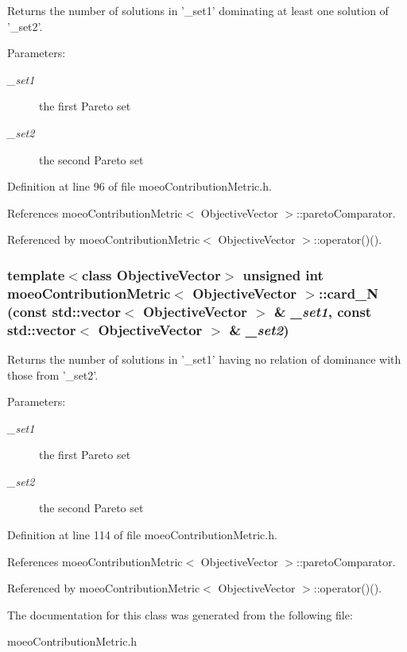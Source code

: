Returns the number of solutions in '\_\-set1' dominating at least one solution of '\_\-set2'. 

\begin{Desc}
\item[Parameters:]
\begin{description}
\item[{\em \_\-set1}]the first Pareto set \item[{\em \_\-set2}]the second Pareto set \end{description}
\end{Desc}


Definition at line 96 of file moeo\-Contribution\-Metric.h.

References moeo\-Contribution\-Metric$<$ Objective\-Vector $>$::pareto\-Comparator.

Referenced by moeo\-Contribution\-Metric$<$ Objective\-Vector $>$::operator()().
\subsubsection{\setlength{\rightskip}{0pt plus 5cm}template$<$class Objective\-Vector$>$ unsigned int \bf{moeo\-Contribution\-Metric}$<$ Objective\-Vector $>$::card\_\-N (const std::vector$<$ Objective\-Vector $>$ \& {\em \_\-set1}, const std::vector$<$ Objective\-Vector $>$ \& {\em \_\-set2})\hspace{0.3cm}{\tt  [inline, private]}}\label{classmoeoContributionMetric_df26b17120ed2271a6d1ec9c8c77b451}


Returns the number of solutions in '\_\-set1' having no relation of dominance with those from '\_\-set2'. 

\begin{Desc}
\item[Parameters:]
\begin{description}
\item[{\em \_\-set1}]the first Pareto set \item[{\em \_\-set2}]the second Pareto set \end{description}
\end{Desc}


Definition at line 114 of file moeo\-Contribution\-Metric.h.

References moeo\-Contribution\-Metric$<$ Objective\-Vector $>$::pareto\-Comparator.

Referenced by moeo\-Contribution\-Metric$<$ Objective\-Vector $>$::operator()().

The documentation for this class was generated from the following file:\begin{CompactItemize}
\item 
moeo\-Contribution\-Metric.h\end{CompactItemize}
